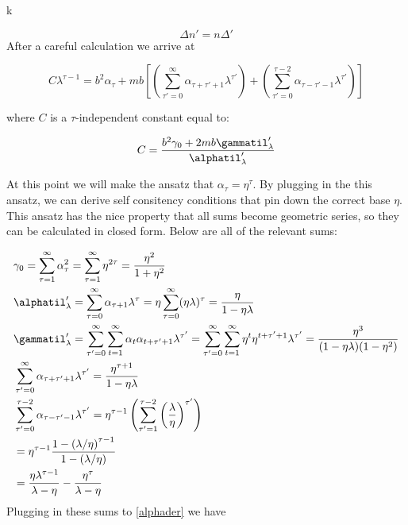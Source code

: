 k\documentclass{article}
\begin{document}
\begin{equation}
    \Delta n' = n\Delta'
\end{equation}
After a careful calculation we arrive at

\begin{equation}\label{alphader}
    C \lambda^{\tau-1} = b^2 \alpha_\tau + mb\left[(\sum_{\tau'=0}^\infty \alpha_{\tau+\tau'+1}\lambda^{\tau'}) + (\sum_{\tau'=0}^{\tau-2}\alpha_{\tau-\tau'-1}\lambda^{\tau'}) \right]
\end{equation}

where $C$ is a $\tau$-independent constant equal to:

\begin{equation}
    C = \frac{b^2\gamma_0 + 2mb\gammatil_\lambda'}{\alphatil_\lambda'}
\end{equation}

At this point we will make the ansatz that $\alpha_\tau = \eta^\tau$. By plugging in the this ansatz, we can derive self consitency conditions that pin down the correct base $\eta$. This ansatz has the nice property that all sums become geometric series, so they can be calculated in closed form. Below are all of the relevant sums:

\begin{alignat}{3}
    &\gamma_0 = \sum_{\tau=1}^\infty \alpha_\tau^2 = \sum_{\tau=1}^\infty \eta^{2\tau} = \frac{\eta^2}{1 + \eta^2} \\
    &\alphatil_\lambda' = \sum_{\tau=0}^\infty \alpha_{\tau+1}\lambda^\tau = \eta \sum_{\tau=0}^\infty({\eta\lambda})^\tau = \frac{\eta}{1-\eta\lambda} \\
    &\gammatil_\lambda' = \sum_{\tau'=0}^\infty\sum_{t=1}^\infty \alpha_t \alpha_{t+\tau'+1}\lambda^{\tau'} = \sum_{\tau'=0}^\infty\sum_{t=1}^\infty \eta^t\eta^{t+\tau'+1}\lambda^{\tau'} = \frac{\eta^3}{(1-\eta\lambda)(1-\eta^2)}\\
    &\sum_{\tau'=0}^\infty \alpha_{\tau+\tau'+1}\lambda^{\tau'} = \frac{\eta^{\tau+1}}{1-\eta\lambda}\\
     &\sum_{\tau'=0}^{\tau-2} \alpha_{\tau-\tau'-1}\lambda^{\tau'} 
     = \eta^{\tau-1}\left(\sum_{\tau'=1}^{\tau-2}\left(\frac{\lambda}{\eta}\right)^{\tau'} \right) \\
     &= \eta^{\tau-1}\frac{1 - \left(\lambda / \eta \right)^{\tau-1}}{1 - \left(\lambda / \eta \right)}\\
     &= \frac{\eta\lambda^{\tau-1}}{\lambda - \eta} - \frac{\eta^\tau}{\lambda-\eta}
\end{alignat}
Plugging in these sums to \eqref{alphader} we have 
\end{document}
